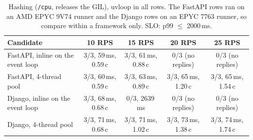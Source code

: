 \begin{table}[t]
\caption{Hashing (\texttt{/cpu}, releases the GIL), uvloop in all rows. The FastAPI rows ran on an AMD EPYC 9V74 runner and the Django rows on an EPYC 7763 runner, so compare within a framework only. SLO: p99 $\le$ 2000\,ms.}
\label{tab:hashing}
\centering\small
\begin{tabular}{lcccc}
\toprule
Candidate & 10 RPS & 15 RPS & 20 RPS & 25 RPS \\
\midrule
FastAPI, inline on the event loop & 3/3, 59\,ms, 0.59\,c & 3/3, 61\,ms, 0.88\,c & 0/3 (no replies) & 0/3 (no replies) \\
FastAPI, 4-thread pool & 3/3, 60\,ms, 0.59\,c & 3/3, 63\,ms, 0.89\,c & 3/3, 65\,ms, 1.20\,c & 3/3, 65\,ms, 1.54\,c \\
Django, inline on the event loop & 3/3, 68\,ms, 0.68\,c & 0/3, 2639\,ms & 0/3 (no replies) & 0/3 (no replies) \\
Django, 4-thread pool & 3/3, 71\,ms, 0.68\,c & 3/3, 71\,ms, 1.02\,c & 3/3, 73\,ms, 1.38\,c & 3/3, 74\,ms, 1.74\,c \\
\bottomrule
\end{tabular}
\end{table}
